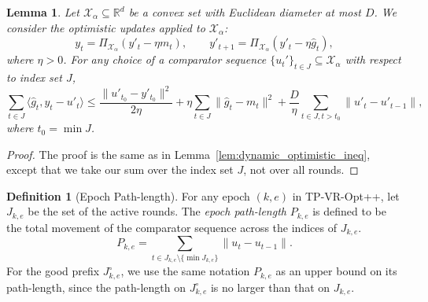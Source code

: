 \documentclass[journal,onecolumn]{IEEEtran}
\newcommand{\cX}{\mathcal{X}}
\theoremstyle{plain}
\newtheorem{lemma}[theorem]{Lemma}
\theoremstyle{definition}
\newtheorem{definition}[theorem]{Definition}
\theoremstyle{remark}
\newcommand{\tpvr}{{\sc TP-VR-Opt}}
\begin{document}
{\begin{lemma}
    \label{lem:epoch-dynamic-optimistic} Let $\mathcal{\cX}_{\alpha} \subseteq \mathbb{R}
    ^{d}$ be a convex set with Euclidean diameter at most $D$. We consider the
    optimistic updates applied to $\mathcal{X}_{\alpha}$:
    \begin{equation*}
        y_{t} = \Pi_{\mathcal{X}_\alpha}(y'_{t} - \eta m_{t}), \qquad y'_{t+1}= \Pi
        _{\mathcal{X}_\alpha}(y'_{t} - \eta \hat g_{t}),
    \end{equation*}
    where $\eta>0$. For any choice of a comparator sequence $\{u_t'\}_{t \in J} \subseteq \mathcal{X}_{\alpha}$ with respect to index set $J$,
    \begin{equation*}
        \sum_{t \in J}\langle \hat g_{t}, y_{t} - u'_{t}\rangle \le\frac{\|u'_{t_0}-y'_{t_0}\|^{2}}{2\eta}
        +\eta\sum_{t \in J}\|\hat g_{t}-m_{t}\|^{2} +\frac{D}{\eta}\sum_{t\in J,
        t>t_0}\|u'_{t}-u'_{t-1}\|,
    \end{equation*}
    where $t_{0} = \min J$.
\end{lemma}

\begin{proof}
    The proof is the same as in Lemma~\ref{lem:dynamic_optimistic_ineq}, except that we take our sum over the index set $J$, not over all rounds.
\end{proof}

\begin{definition}[Epoch Path-length]
    For any epoch $(k, e)$ in \tpvr++, let $J_{k, e}$ be the set of the active rounds. The \emph{epoch path-length} $P_{k, e}$ is defined to be the total movement of the comparator sequence across the indices of $J_{k,e}$. 
    \begin{equation*}
        P_{k,e}= \sum_{t \in J_{k,e} \setminus \{\min J_{k,e}\}}\|u_{t} - u_{t-1}\|.
    \end{equation*}
    For the good prefix $J_{k,e}^{\circ}$, we use the same notation $P_{k,e}$ as an upper bound on its path-length, since the path-length on $J_{k,e}^{\circ}$ is no larger than that on $J_{k,e}$.
\end{definition}

}
\end{document}
